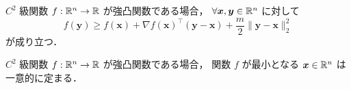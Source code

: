 \begin{theorem}
    $C^2$ 級関数 $f : \mathbb{R}^n \to \mathbb{R}$ が強凸関数である場合，
    $\forall \bm{x}, \bm{y} \in \mathbb{R}^n$ に対して
    \begin{equation}
        f(\bm{y}) \ge f(\bm{x}) + \nabla f(\bm{x})^\top (\bm{y} - \bm{x})
        + \frac{m}{2} \| \bm{y} - \bm{x} \|_2^2
    \end{equation}
    が成り立つ．
\end{theorem}

\begin{theorem}
    $C^2$ 級関数 $f : \mathbb{R}^n \to \mathbb{R}$ が強凸関数である場合，
    関数 $f$ が最小となる $\bm{x} \in \mathbb{R}^n$ は一意的に定まる．
\end{theorem}







